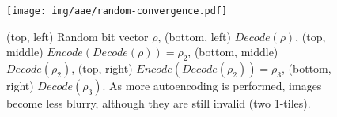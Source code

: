 \documentclass[10pt,letterpaper]{article}
\begin{document}
\begin{figure}[tbp]
 \centering
 \texttt{[image: img/aae/random-convergence.pdf]}
 \caption{
(top, left) Random bit vector $\rho$,
(bottom, left) $Decode(\rho)$,
(top, middle)  $Encode(Decode(\rho))=\rho_2$,
(bottom, middle) $Decode(\rho_2)$,
(top, right)  $Encode(Decode(\rho_2))=\rho_3$,
(bottom, right) $Decode(\rho_3)$.
As more autoencoding is performed, images become less blurry,
 although they are still invalid (two 1-tiles).
}
\label{fig:random-bit}
\end{figure}






% 
% 
% 

\fontsize{9.5pt}{10.5pt}
\selectfont
 


\end{document}
